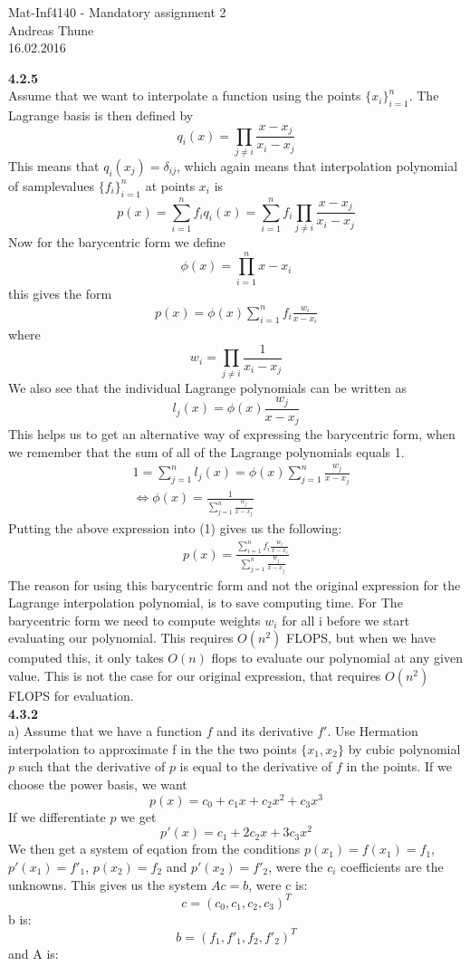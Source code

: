 \documentclass[11pt,a4paper]{report}
\begin{document}
\begin{center}

\LARGE Mat-Inf4140 - Mandatory assignment 2
\\
Andreas Thune
\\
\LARGE
16.02.2016

\end{center}
\textbf{4.2.5}
\\
Assume that we want to interpolate a function using the points $\{ x_i\}_{i=1}^n$. The Lagrange basis is then defined by $$q_i(x) = \prod_{j\neq i} \frac{x-x_j}{x_i-x_j} $$ This means that $q_i(x_j) = \delta_{ij}$, which again means that interpolation polynomial of samplevalues $\{ f_i\}_{i=1}^n$ at points $x_i$ is $$p(x) = \sum_{i=1}^n f_iq_i(x)= \sum_{i=1}^n f_i\prod_{j\neq i} \frac{x-x_j}{x_i-x_j}$$ Now for the barycentric form we define $$\phi(x) = \prod_{i=1}^n x-x_i $$ this gives the form 
\begin{align}
p(x) = \phi(x)\sum_{i=1}^n f_i\frac{w_i}{x-x_i} 
\end{align}
where $$w_i = \prod_{j\neq i} \frac{1}{x_i-x_j}$$
We also see that the individual Lagrange polynomials can be written as $$l_j(x)=\phi(x)\frac{w_j}{x-x_j} $$ This helps us to get an alternative way of expressing the barycentric form, when we remember that the sum of all of the Lagrange polynomials equals 1. 
\begin{align*}
&1=\sum_{j=1}^n l_j(x)= \phi(x)\sum_{j=1}^n \frac{w_j}{x-x_j} \\
&\iff \phi(x) = \frac{1}{\sum_{j=1}^n \frac{w_j}{x-x_j}}
\end{align*} 
Putting the above expression into (1) gives us the following:
\begin{align*}
p(x)=\frac{\sum_{i=1}^n f_i\frac{w_i}{x-x_i}}{\sum_{j=1}^n \frac{w_j}{x-x_j}}
\end{align*}
The reason for using this barycentric form and not the original expression for the Lagrange interpolation polynomial, is to save computing time. For The barycentric form we need to compute weights $w_i$ for all i before we start evaluating our polynomial. This requires $O(n^2)$ FLOPS, but when we have computed this, it only takes $O(n)$ flops to evaluate our polynomial at any given value. This is not the case for our original expression, that requires $O(n^2)$ FLOPS for evaluation. 
\\
\textbf{4.3.2}
\\
a) Assume that we have a function $f$ and its derivative $f'$. Use Hermation interpolation to approximate f in the the two points $\{x_1,x_2\}$ by cubic polynomial $p$ such that the derivative of $p$ is equal to the derivative of $f$ in the points. If we choose the power basis, we want $$p(x)=c_0 + c_1x + c_2x^2 + c_3x^3$$ If we differentiate $p$ we get $$p'(x)=c_1 + 2c_2x + 3c_3x^2$$ We then get a system of eqation from the conditions $p(x_1)=f(x_1)=f_1$, $p'(x_1)=f'_1$, $p(x_2)=f_2$ and $p'(x_2)=f'_2$, were the $c_i$ coefficients are the unknowns. This gives us the system $Ac=b$, were c is: $$c=(c_0,c_1,c_2,c_3)^T$$ b is: $$b=(f_1,f'_1,f_2,f'_2)^T$$ and A is:  
\end{document}
